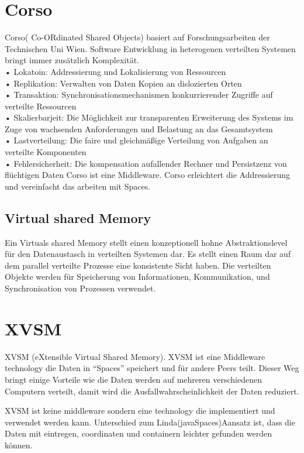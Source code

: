 \documentclass[a4paper,12pt]{scrreprt}
\begin{document}
		
		\section{Corso}
			Corso( Co-ORdinated Shared Objects) basiert auf Forschungsarbeiten der Technischen Uni Wien.
			Software Entwicklung in heterogenen verteilten Systemen bringt immer zusätzlich Komplexität.\\
			•	Lokatoin: Addressierung und Lokalisierung von Ressourcen\\
			•	Replikation: Verwalten von Daten Kopien an dislozierten Orten\\
			•	Transaktion: Synchronisationsmechanismen konkurrierender Zugriffe auf verteilte Ressourcen\\
			•	Skalierbarjeit: Die Möglichkeit zur transparenten Erweiterung des Systems im Zuge von wachsenden Anforderungen und Belastung an das Gesamtsystem\\
			•	Lastverteilung: Die faire und gleichmäßige Verteilung von Aufgaben an verteilte Komponenten\\
			•	Fehlersicherheit:  Die kompensation aufallender Rechner und Persistzenz von flüchtigen Daten
			Corso ist eine Middleware. Corso erleichtert die Addressierung und vereinfacht das arbeiten mit Spaces.\\
			
			\subsection{Virtual shared Memory}
				Ein Virtuals shared Memory stellt einen konzeptionell hohne Abstraktionslevel für den Datenaustasch in verteilten Systemen dar.  Es stellt einen Raum dar auf dem parallel verteilte Prozesse eine konsistente Sicht haben. Die verteilten Objekte werden für Speicherung von Informationen, Kommunikation, und Synchronisation von Prozessen verwendet.
		\section{XVSM}
		XVSM (eXtensible Virtual Shared Memory). XVSM ist eine Middleware technology die Daten in “Spaces” speichert  und für andere Peers teilt. Dieser Weg bringt einige Vorteile wie die Daten werden auf mehreren verschiedenen Computern verteilt, damit wird die Ausfallwahrscheinlichkeit der Daten reduziert.
		
		XVSM ist keine middleware sondern eine technology die implementiert und verwendet werden kann.
		Unterschied zum Linda(javaSpaces)Aansatz ist, dass die Daten mit eintregen, coordinaten und containern leichter gefunden werden können.
		
\end{document}
